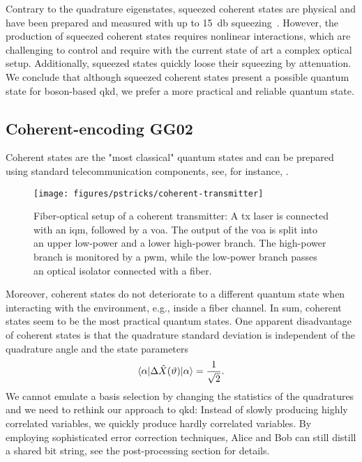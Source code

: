 Contrary to the quadrature eigenstates, squeezed coherent states are physical and have been prepared and measured with up to \SI{15}{\decibel} squeezing~\cite{Vahlbruch2016}.
However, the production of squeezed coherent states requires nonlinear interactions, which are challenging to control and require with the current state of art a complex optical setup.
Additionally, squeezed states quickly loose their squeezing by attenuation.
We conclude that although squeezed coherent states present a possible quantum state for boson-based \gls{qkd}, we prefer a more practical and reliable quantum state.

\FloatBarrier
\subsection{Coherent-encoding GG02}

Coherent states are the "most classical" quantum states and can be prepared using standard telecommunication components, see, for instance, .
\begin{figure}[htb]
	\centering
	\texttt{[image: figures/pstricks/coherent-transmitter]}
	\caption{Fiber-optical setup of a coherent transmitter: A \gls{tx} laser is connected with an \gls{iqm}, followed by a \gls{voa}. The output of the \gls{voa} is split into an upper low-power and a lower high-power branch. The high-power branch is monitored by a \gls{pwm}, while the low-power branch passes an optical isolator connected with a fiber.}\label{fig:coherent_transmitter}
\end{figure}
Moreover, coherent states do not deteriorate to a different quantum state when interacting with the environment, e.g., inside a fiber channel.
In sum, coherent states seem to be the most practical quantum states.
One apparent disadvantage of coherent states is that the quadrature standard deviation is independent of the quadrature angle and the state parameters~\cite[p.~59]{Barnett2002}
\begin{equation}
	\langle\alpha\rvert
	\Delta\hat{X}(\vartheta)
	\lvert\alpha\rangle
	=
	\frac{1}{\sqrt{2}}
	.
\end{equation}
We cannot emulate a basis selection by changing the statistics of the quadratures and we need to rethink our approach to \gls{qkd}:
Instead of slowly producing highly correlated variables, we quickly produce hardly correlated variables.
By employing sophisticated error correction techniques, Alice and Bob can still distill a shared bit string, see the post-processing section for details.

